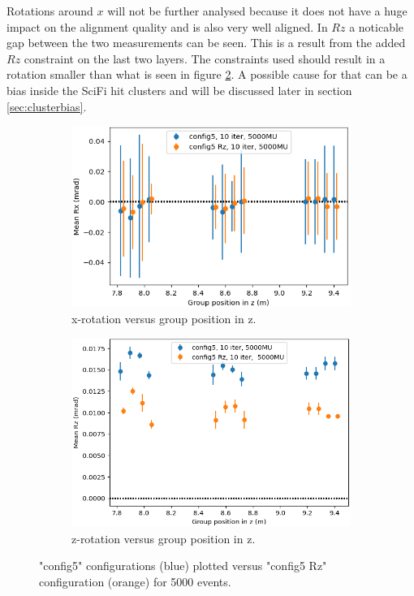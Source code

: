 Rotations around $x$ will not be further analysed because it does not have a huge impact on the alignment quality and is also very well aligned. In $Rz$ a noticable gap
between the two measurements can be seen. This is a result from the added $Rz$ constraint on the last two layers.
The constraints used should result in a rotation smaller than what is seen in figure \ref{fig:config5_Rz}.
A possible cause for that can be a bias inside the SciFi hit clusters and will be discussed later in section \ref{sec:clusterbias}.

\begin{figure}
  \centering
  \begin{subfigure}[b]{0.4\textwidth}
    \centering
    \includegraphics[width=\textwidth]{plots/renewed_plots/Rx_config5.png}
    \caption{x-rotation versus group position in z.}
    \label{fig:config5_Rx}
  \end{subfigure}
  \hfill
  \begin{subfigure}[b]{0.4\textwidth}
    \centering
    \includegraphics[width=\textwidth]{plots/renewed_plots/Rz_config5.png}
    \caption{z-rotation versus group position in z.}
    \label{fig:config5_Rz}
  \end{subfigure}
  \caption{"config5" configurations (blue) plotted versus "config5 Rz" configuration (orange) for 5000 events.}
  \label{fig:config5_rot}
\end{figure}

